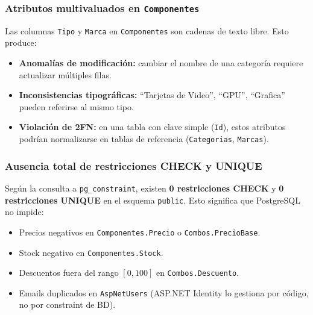 \subsubsection{Atributos multivaluados en \texttt{Componentes}}

Las columnas \texttt{Tipo} y \texttt{Marca} en \texttt{Componentes} son cadenas de texto libre.
Esto produce:
\begin{itemize}
  \item \textbf{Anomalías de modificación:} cambiar el nombre de una categoría requiere actualizar múltiples filas.
  \item \textbf{Inconsistencias tipográficas:} ``Tarjetas de Video'', ``GPU'', ``Grafica'' pueden referirse al mismo tipo.
  \item \textbf{Violación de 2FN:} en una tabla con clave simple (\texttt{Id}), estos atributos podrían normalizarse en tablas de referencia (\texttt{Categorias}, \texttt{Marcas}).
\end{itemize}

\subsubsection{Ausencia total de restricciones CHECK y UNIQUE}

Según la consulta a \texttt{pg\_constraint}, existen \textbf{0 restricciones CHECK} y \textbf{0 restricciones UNIQUE} en el esquema \texttt{public}.
Esto significa que PostgreSQL no impide:
\begin{itemize}
  \item Precios negativos en \texttt{Componentes.Precio} o \texttt{Combos.PrecioBase}.
  \item Stock negativo en \texttt{Componentes.Stock}.
  \item Descuentos fuera del rango $[0, 100]$ en \texttt{Combos.Descuento}.
  \item Emails duplicados en \texttt{AspNetUsers} (ASP.NET Identity lo gestiona por código, no por constraint de BD).
\end{itemize}

